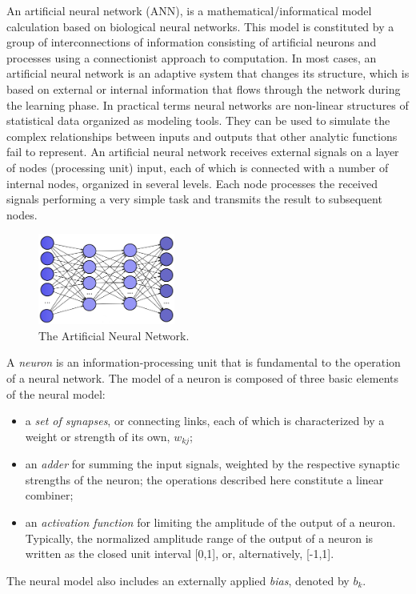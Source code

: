 An artificial neural network (ANN), is a mathematical/informatical model calculation based on biological neural networks.
This model is constituted by a group of interconnections of information consisting of artificial neurons and processes using a connectionist approach to computation. In most cases, an artificial neural network is an adaptive system that changes its structure, which is based on external or internal information that flows through the network during the learning phase. 
In practical terms neural networks are non-linear structures of statistical data organized as modeling tools.
They can be used to simulate the complex relationships between inputs and outputs that other analytic functions fail to represent.
An artificial neural network receives external signals on a layer of nodes (processing unit) input, each of which is connected with a number of internal nodes, organized in several levels. Each node processes the received signals performing a very simple task  and transmits the result to subsequent nodes. 

\begin{figure}[t]
	\centering
	\includegraphics[width=0.4\textwidth]{img/ANN}
	\caption{The Artificial Neural Network.}
	\label{fig:ANN}
\end{figure}

A \textit{neuron} is an information-processing unit that is fundamental to the operation of a neural network.
The model of a neuron is composed of three basic elements of the neural model:
\begin{itemize}
\item a \textit{set of synapses}, or connecting links, each of which is characterized by a weight or strength of its own, $w_{kj}$;
\item an \textit{adder} for summing the input signals, weighted by the respective synaptic strengths of the neuron; the operations described here constitute a linear combiner;
\item an \textit{activation function} for limiting the amplitude of the output of a neuron. Typically, the normalized amplitude range of the output of a neuron is written as the closed unit interval [0,1], or, alternatively, [-1,1].
\end{itemize}
The neural model also includes an externally applied \textit{bias}, denoted by $b_k$.

